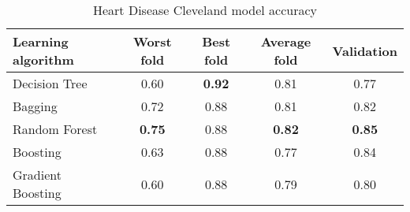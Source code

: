 \begin{table}[htbp]
    \centering
    \begin{tabular}{l c c c c}
    \toprule
    Learning algorithm  & Worst fold     & Best fold     & Average fold  & Validation    \\
    \midrule
    Decision Tree       &  0.60          & \textbf{0.92} & 0.81          & 0.77          \\
    Bagging             &  0.72          & 0.88          & 0.81          & 0.82          \\
    Random Forest       &  \textbf{0.75} & 0.88          & \textbf{0.82} & \textbf{0.85} \\
    Boosting            &  0.63          & 0.88          & 0.77          & 0.84          \\
    Gradient Boosting   &  0.60          & 0.88          & 0.79          & 0.80          \\
    \bottomrule
    \end{tabular}
    \caption{Heart Disease Cleveland model accuracy}
\end{table}
